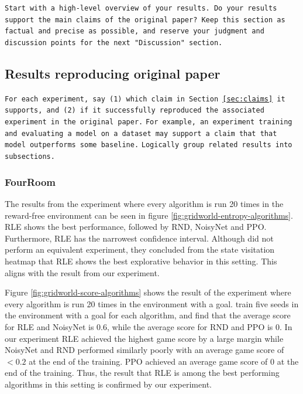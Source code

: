 \documentclass[10pt]{article} %
\begin{document}
\noindent \texttt{Start with a high-level overview of your results. Do your results support the main claims of the original paper? Keep this section as factual and precise as possible, and reserve your judgment and discussion points for the next "Discussion" section.}


\subsection{Results reproducing original paper}
\texttt{For each experiment, say (1) which claim in Section~\ref{sec:claims} it supports, and (2) if it successfully reproduced the associated experiment in the original paper.}
\texttt{For example, an experiment training and evaluating a model on a dataset may support a claim that that model outperforms some baseline.}
\texttt{Logically group related results into subsections.}

\subsubsection{FourRoom}
The results from the experiment where every algorithm is run 20 times in the reward-free environment can be seen in figure \ref{fig:gridworld-entropy-algorithms}. RLE shows the best performance, followed by RND, NoisyNet and PPO. Furthermore, RLE has the narrowest confidence interval. Although \cite{rle-paper} did not perform an equivalent experiment, they concluded from the state visitation heatmap that RLE shows the best explorative behavior in this setting. This aligns with the result from our experiment. 

Figure \ref{fig:gridworld-score-algorithms} shows the result of the experiment where every algorithm is run 20 times in the environment with a goal. \cite{rle-paper} train five seeds in the environment with a goal for each algorithm, and find that the average score for RLE and NoisyNet is 0.6, while the average score for RND and PPO is 0. In our experiment RLE achieved the highest game score by a large margin while NoisyNet and RND performed similarly poorly with an average game score of $<0.2$ at the end of the training. PPO achieved an average game score of 0 at the end of the training. Thus, the result that RLE is among the best performing algorithms in this setting is confirmed by our experiment.
\end{document}
